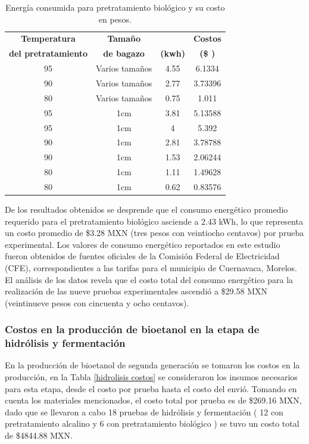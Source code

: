 \documentclass[12pt]{article}
\begin{document}
	
	\begin{table}[H]
		\centering
		\caption{Energía consumida para pretratamiento biológico  y su costo en pesos. }
		\label{tabla de energia}
	{\fontsize{9}{10.8}\selectfont
		\begin{tabular}{|c|c|c|c|}
			\hline
			\textbf{Temperatura} & \textbf{Tamaño }  & \textbf{
			} & \textbf{Costos } \\ 
			\textbf{del pretratamiento} &	\textbf{ de bagazo}  & 	\textbf{(kwh) }& 	\textbf{(\$ )} \\ \hline
        95 & Varios tamaños & 4.55 & 6.1334  \\ \hline
	90 & Varios tamaños & 2.77 & 3.73396  \\ \hline
	80 & Varios tamaños & 0.75 & 1.011  \\ \hline
	95 & 1cm & 3.81 & 5.13588  \\ \hline
	95 & 1cm & 4 & 5.392  \\ \hline
	90 & 1cm & 2.81 & 3.78788  \\ \hline
	90 & 1cm & 1.53 & 2.06244  \\ \hline
	80 & 1cm & 1.11 & 1.49628  \\ \hline
	80 & 1cm & 0.62 & 0.83576  \\ \hline
			
			
		\end{tabular}}
	
	\end{table}
	
	
De los resultados obtenidos se desprende que el consumo energético promedio requerido para el pretratamiento biológico asciende a 2.43 kWh, lo que representa un costo promedio de \$3.28 MXN (tres pesos con veintiocho centavos) por prueba experimental. Los valores de consumo energético reportados en este estudio fueron obtenidos de fuentes oficiales de la Comisión Federal de Electricidad (CFE), correspondientes a las tarifas para el municipio de Cuernavaca, Morelos. El análisis de los datos revela que el costo total del consumo energético para la realización de las nueve pruebas experimentales ascendió a \$29.58 MXN (veintinueve pesos con cincuenta y ocho centavos).
	
	\subsubsection{Costos en la producción de bioetanol en la etapa de hidrólisis y fermentación}
	
	En la producción de bioetanol de segunda generación se tomaron los costos en la producción, en la Tabla \ref{hidrolisis costos} se consideraron los insumos necesarios para esta etapa, desde el costo por prueba hasta el costo del envió. Tomando en cuenta los materiales mencionados, el costo total por prueba es de \$269.16 MXN, dado que se llevaron a cabo 18 pruebas de hidrólisis y fermentación ( 12 con pretratamiento alcalino y 6 con pretratamiento biológico ) se tuvo un costo total de \$4844.88 MXN.
	
\end{document}
